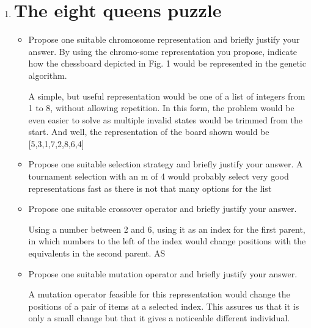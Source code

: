 \documentclass{article}
\begin{document}
\begin{enumerate}
    \item \section*{The eight queens puzzle}
    \begin{itemize}
        \item Propose one suitable chromosome representation and briefly justify your answer.  By using the chromo-some representation you propose, indicate how the chessboard depicted in Fig. 1 would be represented in the genetic algorithm.

        A simple, but useful representation would be one of a list of integers from 1 to 8, without allowing repetition. In this form, the problem would be even easier to solve as multiple invalid states would be trimmed from the start. And well, the representation of the board shown would be [5,3,1,7,2,8,6,4]

        \item Propose one suitable selection strategy and briefly justify your answer.
        A tournament selection with an m of 4 would probably select very good representations fast as there is not that many options for the list

        \item Propose one suitable crossover operator and briefly justify your answer.

        Using a number between 2 and 6, using it as an index for the first parent, in which numbers to the left of the index would change positions with the equivalents in the second parent. AS

        \item Propose one suitable mutation operator and briefly justify your answer.

        A mutation operator feasible for this representation would change the positions of a pair of items at a selected index. This assures us that it is only a small change but that it gives a noticeable different individual.



\end{itemize}
\end{enumerate}
\end{document}
